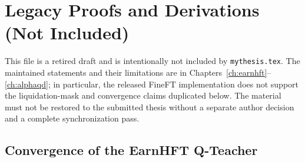 
\chapter{Legacy Proofs and Derivations (Not Included)} %
\label{AppendixA}

This file is a retired draft and is intentionally not included by \texttt{mythesis.tex}. The maintained statements and their limitations are in Chapters~\ref{ch:earnhft}--\ref{ch:alphaqd}; in particular, the released FineFT implementation does not support the liquidation-mask and convergence claims duplicated below. The material must not be restored to the submitted thesis without a separate author decision and a complete synchronization pass.

\section{Convergence of the EarnHFT Q-Teacher}
\label{app:earnhft_proof}

